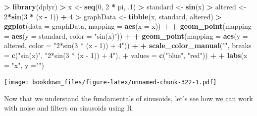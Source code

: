 \documentclass[]{krantz}
\makeatletter
\newenvironment{Shaded}{\begin{snugshade}}{\end{snugshade}}
\newcommand{\KeywordTok}[1]{\textcolor[rgb]{0.27,0.27,0.27}{\textbf{#1}}}
\newcommand{\DataTypeTok}[1]{\textcolor[rgb]{0.27,0.27,0.27}{#1}}
\newcommand{\DecValTok}[1]{\textcolor[rgb]{0.06,0.06,0.06}{#1}}
\newcommand{\StringTok}[1]{\textcolor[rgb]{0.5,0.5,0.5}{#1}}
\newcommand{\OperatorTok}[1]{\textcolor[rgb]{0.43,0.43,0.43}{\textbf{#1}}}
\newcommand{\NormalTok}[1]{#1}
\newenvironment{kframe}{%
\medskip{}
\setlength{\fboxsep}{.8em}
 \def\at@end@of@kframe{}%
 \ifinner\ifhmode%
  \def\at@end@of@kframe{\end{minipage}}%
  \begin{minipage}{\columnwidth}%
 \fi\fi%
 \def\FrameCommand##1{\hskip\@totalleftmargin \hskip-\fboxsep
 \colorbox{shadecolor}{##1}\hskip-\fboxsep
     \hskip-\linewidth \hskip-\@totalleftmargin \hskip\columnwidth}%
 \MakeFramed {\advance\hsize-\width
   \@totalleftmargin\z@ \linewidth\hsize
   \@setminipage}}%
 {\par\unskip\endMakeFramed%
 \at@end@of@kframe}
\renewenvironment{Shaded}{\begin{kframe}}{\end{kframe}}
\makeatother
\begin{document}
\begin{Shaded}
\begin{Highlighting}[]
\OperatorTok{>}\StringTok{ }\KeywordTok{library}\NormalTok{(dplyr)}
\OperatorTok{>}\StringTok{ }\NormalTok{x <-}\StringTok{ }\KeywordTok{seq}\NormalTok{(}\DecValTok{0}\NormalTok{, }\DecValTok{2} \OperatorTok{*}\StringTok{ }\NormalTok{pi, .}\DecValTok{1}\NormalTok{)}
\OperatorTok{>}\StringTok{ }\NormalTok{standard <-}\StringTok{ }\KeywordTok{sin}\NormalTok{(x)}
\OperatorTok{>}\StringTok{ }\NormalTok{altered <-}\StringTok{ }\DecValTok{2}\OperatorTok{*}\KeywordTok{sin}\NormalTok{(}\DecValTok{3} \OperatorTok{*}\StringTok{ }\NormalTok{(x }\OperatorTok{-}\StringTok{ }\DecValTok{1}\NormalTok{)) }\OperatorTok{+}\StringTok{ }\DecValTok{4}
\OperatorTok{>}\StringTok{ }\NormalTok{graphData <-}\StringTok{ }\KeywordTok{tibble}\NormalTok{(x, standard, altered)}
\OperatorTok{>}\StringTok{ }\KeywordTok{ggplot}\NormalTok{(}\DataTypeTok{data =}\NormalTok{ graphData, }\DataTypeTok{mapping =} \KeywordTok{aes}\NormalTok{(}\DataTypeTok{x =}\NormalTok{ x)) }\OperatorTok{+}\StringTok{ }
\OperatorTok{+}\StringTok{   }\KeywordTok{geom_point}\NormalTok{(}\DataTypeTok{mapping =} \KeywordTok{aes}\NormalTok{(}\DataTypeTok{y =}\NormalTok{ standard, }\DataTypeTok{color =} \StringTok{"sin(x)"}\NormalTok{)) }\OperatorTok{+}\StringTok{ }
\OperatorTok{+}\StringTok{   }\KeywordTok{geom_point}\NormalTok{(}\DataTypeTok{mapping =} \KeywordTok{aes}\NormalTok{(}\DataTypeTok{y =}\NormalTok{ altered, }\DataTypeTok{color =} \StringTok{"2*sin(3 * (x - 1)) + 4"}\NormalTok{)) }\OperatorTok{+}\StringTok{ }
\OperatorTok{+}\StringTok{   }\KeywordTok{scale_color_manual}\NormalTok{(}\StringTok{""}\NormalTok{, }\DataTypeTok{breaks =} \KeywordTok{c}\NormalTok{(}\StringTok{"sin(x)"}\NormalTok{, }\StringTok{"2*sin(3 * (x - 1)) + 4"}\NormalTok{), }
\OperatorTok{+}\StringTok{                      }\DataTypeTok{values =} \KeywordTok{c}\NormalTok{(}\StringTok{"blue"}\NormalTok{, }\StringTok{"red"}\NormalTok{)) }\OperatorTok{+}\StringTok{ }
\OperatorTok{+}\StringTok{   }\KeywordTok{labs}\NormalTok{(}\DataTypeTok{x =} \StringTok{"x"}\NormalTok{, }\DataTypeTok{y =}\StringTok{""}\NormalTok{)}
\end{Highlighting}
\end{Shaded}

\texttt{[image: bookdown\_files/figure-latex/unnamed-chunk-322-1.pdf]}

Now that we understand the fundamentals of sinusoids, let's see how we
can work with noise and filters on sinusoids using R.
\end{document}
